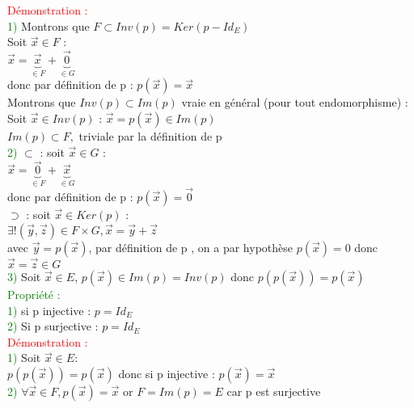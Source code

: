 \documentclass{article}
\begin{document}
\textcolor{red}{Démonstration :} \\ 
\textcolor{green}{1)} Montrons que $F \subset Inv(p)=Ker(p-Id_E)$ \\ 
Soit $\vec{x} \in F$ : \\ 
$\vec{x}= \underbrace{\vec{x}}_{\in F}+ \underbrace{\vec{0}}_{\in G}$ \\ 
donc par définition de p : $p(\vec{x})=\vec{x}$ \\ 
Montrons que $Inv(p) \subset Im(p)$ vraie en général (pour tout endomorphisme) : \\ 
Soit $\vec{x} \in Inv(p)$ : $\vec{x}=p(\vec{x}) \in Im(p)$ \\ 
$Im(p) \subset F,$ triviale par la définition de p \\ 
\textcolor{green}{2)} $\subset$ : soit $\vec{x} \in G$ : \\ 
$\vec{x}=\underbrace{\vec{0}}_{\in F}+ \underbrace{\vec{x}}_{\in G}$ \\ 
donc par définition de p : $p(\vec{x})=\vec{0}$ \\ 
$\supset$ : soit $\vec{x} \in Ker(p)$ : \\ 
$\exists!(\vec{y},\vec{z}) \in F \times G, \vec{x}=\vec{y}+ \vec{z}$ \\ 
avec $\vec{y}=p(\vec{x})$, par définition de p , on a par hypothèse $p(\vec{x})=0$ donc $\vec{x}=\vec{z}\in G$ \\ 
\textcolor{green}{3)} Soit $\vec{x} \in E$, $p(\vec{x}) \in Im(p)=Inv(p)$ donc $p(p(\vec{x}))=p(\vec{x})$ \\ 
\textcolor{green}{Propriété :} \\ 
\textcolor{green}{1)} si p injective : $p=Id_E$ \\ 
\textcolor{green}{2)} Si p surjective : $p=Id_E$ \\ 
\textcolor{red}{Démonstration :} \\ 
\textcolor{green}{1)} Soit $\vec{x} \in E :$ \\ 
$p(p(\vec{x}))=p(\vec{x})$ donc si p injective : $p(\vec{x})=\vec{x}$ \\ 
\textcolor{green}{2)} $\forall \vec{x} \in F,p(\vec{x})=\vec{x}$ or $F=Im(p)=E$ car p est surjective
\end{document}
